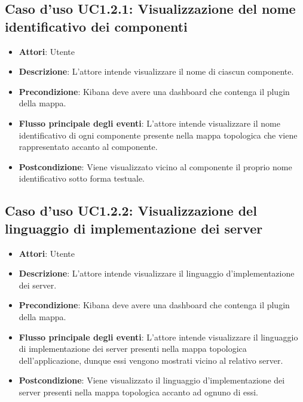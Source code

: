 \subsection{Caso d'uso UC1.2.1: Visualizzazione del nome identificativo dei componenti}
\begin{itemize}
	\item \textbf{Attori}: Utente
	\item \textbf{Descrizione}: L'attore intende visualizzare il nome di ciascun componente.
	\item \textbf{Precondizione}: Kibana deve avere una dashboard che contenga il plugin della mappa.
	\item \textbf{Flusso principale degli eventi}: L'attore intende visualizzare il nome identificativo di ogni componente presente nella mappa topologica che viene rappresentato accanto al componente.
	\item \textbf{Postcondizione}: Viene visualizzato vicino al componente il proprio nome identificativo sotto forma testuale.
\end{itemize}
\subsection{Caso d'uso UC1.2.2: Visualizzazione del linguaggio di implementazione dei server}
\begin{itemize}
	\item \textbf{Attori}: Utente
	\item \textbf{Descrizione}: L'attore intende visualizzare il linguaggio d'implementazione dei server.
	\item \textbf{Precondizione}: Kibana deve avere una dashboard che contenga il plugin della mappa.
	\item \textbf{Flusso principale degli eventi}: L'attore intende visualizzare il linguaggio di implementazione dei server presenti nella mappa topologica dell'applicazione, dunque essi vengono mostrati vicino al relativo server.
	\item \textbf{Postcondizione}: Viene visualizzato il linguaggio d'implementazione dei server presenti nella mappa topologica accanto ad ognuno di essi.
\end{itemize}
